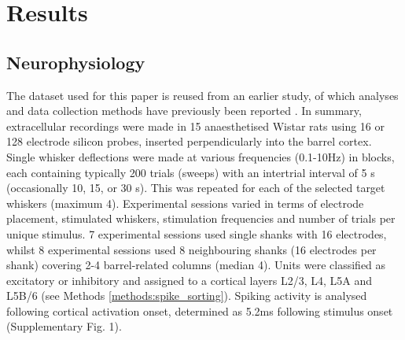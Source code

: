 \documentclass{article}
\begin{document}

\section{Results}

\subsection*{Neurophysiology}

The dataset used for this paper is reused from an earlier study, of which analyses and data collection methods have previously been reported \cite{reyes2014laminar}. In summary, extracellular recordings were made in 15 anaesthetised Wistar rats using 16 or 128 electrode silicon probes, inserted perpendicularly into the barrel cortex. Single whisker deflections were made at various frequencies (0.1-10Hz) in blocks, each containing typically 200 trials (sweeps) with an intertrial interval of 5 s (occasionally 10, 15, or 30 s). This was repeated for each of the selected target whiskers (maximum 4). Experimental sessions varied in terms of electrode placement, stimulated whiskers, stimulation frequencies and number of trials per unique stimulus. 7 experimental sessions used single shanks with 16 electrodes, whilst 8 experimental sessions used 8 neighbouring shanks (16 electrodes per shank) covering 2-4 barrel-related columns (median 4). Units were classified as excitatory or inhibitory and assigned to a cortical layers L2/3, L4, L5A and L5B/6 (see Methods \ref{methods:spike_sorting}). Spiking activity is analysed following cortical activation onset, determined as 5.2ms following stimulus onset (Supplementary Fig. 1).
\end{document}
